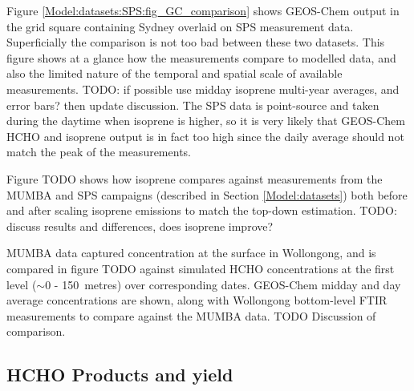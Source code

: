     
    Figure \ref{Model:datasets:SPS:fig_GC_comparison} shows GEOS-Chem output in the grid square containing Sydney overlaid on SPS measurement data.
    Superficially the comparison is not too bad between these two datasets.
    This figure shows at a glance how the measurements compare to modelled data, and also the limited nature of the temporal and spatial scale of available measurements.
    TODO: if possible use midday isoprene multi-year averages, and error bars? then update discussion.
    The SPS data is point-source and taken during the daytime when isoprene is higher, so it is very likely that GEOS-Chem HCHO and isoprene output is in fact too high since the daily average should not match the peak of the measurements.
    
    
    
    
    Figure TODO shows how isoprene compares against measurements from the MUMBA and SPS campaigns (described in Section \ref{Model:datasets}) both before and after scaling isoprene emissions to match the top-down estimation.
    TODO: discuss results and differences, does isoprene improve?
    
    
    MUMBA data captured concentration at the surface in Wollongong, and is compared in figure TODO against simulated HCHO concentrations at the first level ($\sim$0 - 150~metres) over corresponding dates.
    GEOS-Chem midday and day average concentrations are shown, along with Wollongong bottom-level FTIR measurements to compare against the MUMBA data.
    TODO Discussion of comparison.
  
    
  \subsection{HCHO Products and yield}
    \label{BioIsop:results:HCHOYield}
    
